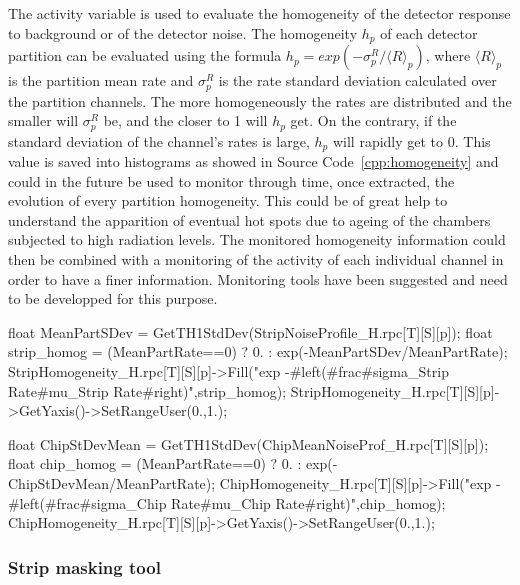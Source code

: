 	The activity variable is used to evaluate the homogeneity of the detector response to background or of the detector noise. The homogeneity $h_p$ of each detector partition can be evaluated using the formula $h_p = exp(-\sigma^{R}_p/\langle R\rangle_p)$, where $\langle R\rangle_p$ is the partition mean rate and $\sigma^{R}_p$ is the rate standard deviation calculated over the partition channels. The more homogeneously the rates are distributed and the smaller will $\sigma^{R}_p$ be, and the closer to 1 will $h_p$ get. On the contrary, if the standard deviation of the channel's rates is large, $h_p$ will rapidly get to 0. This value is saved into histograms as showed in Source Code~\ref{cpp:homogeneity} and could in the future be used to monitor through time, once extracted, the evolution of every partition homogeneity. This could be of great help to understand the apparition of eventual hot spots due to ageing of the chambers subjected to high radiation levels. The monitored homogeneity information could then be combined with a monitoring of the activity of each individual channel in order to have a finer information. Monitoring tools have been suggested and need to be developped for this purpose.\\
	
	\begin{code}
	\begin{cppcode}
float MeanPartSDev = GetTH1StdDev(StripNoiseProfile_H.rpc[T][S][p]);
float strip_homog = (MeanPartRate==0)
	? 0.
	: exp(-MeanPartSDev/MeanPartRate);
StripHomogeneity_H.rpc[T][S][p]->Fill("exp -#left(#frac{#sigma_{Strip Rate}}{#mu_{Strip Rate}}#right)",strip_homog);
StripHomogeneity_H.rpc[T][S][p]->GetYaxis()->SetRangeUser(0.,1.);

float ChipStDevMean = GetTH1StdDev(ChipMeanNoiseProf_H.rpc[T][S][p]);
float chip_homog = (MeanPartRate==0)
	? 0.
	: exp(-ChipStDevMean/MeanPartRate);
ChipHomogeneity_H.rpc[T][S][p]->Fill("exp -#left(#frac{#sigma_{Chip Rate}}{#mu_{Chip Rate}}#right)",chip_homog);
ChipHomogeneity_H.rpc[T][S][p]->GetYaxis()->SetRangeUser(0.,1.);
	\end{cppcode}
	\label{cpp:homogeneity}
	\vspace{5mm}
	\end{code}
		
		\subsubsection{Strip masking tool}
		\label{app2:sssec:mask}
	
